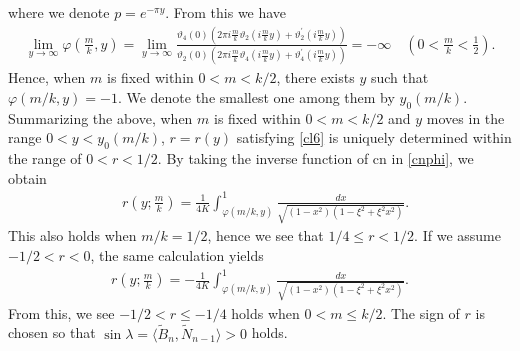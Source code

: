 \documentclass[10pt,leqno]{amsart}
\numberwithin{equation}{section}
\begin{document}
where we denote $p=e^{-\pi y}$.
From this we have
\begin{align}
    \lim_{y\to \infty}\varphi\left(\frac{m}{k},y\right)=\lim_{y\to \infty}\frac{\vartheta_4\left(0\right)\left(2\pi i\frac{m}{k}\vartheta_2\left(i\frac{m}{k}y\right)+\vartheta_2^{'}\left(i\frac{m}{k}y\right)\right)}{\vartheta_2\left(0\right)\left(2\pi i\frac{m}{k}\vartheta_4\left(i\frac{m}{k}y\right)+\vartheta_4^{'}\left(i\frac{m}{k}y\right)\right)}=-\infty\quad(0<\frac{m}{k}<\frac{1}{2}).
\end{align}
Hence, when $m$ is fixed within $0<m<k/2$, there exists $y$ such that $\varphi\left(m/k,y\right)=-1$. We denote the smallest one among them by $y_0(m/k)$.
Summarizing the above, when $m$ is fixed within $0<m<k/2$ and $y$ moves in the range $0<y< y_0(m/k)$, $r=r(y)$ satisfying \eqref{cl6} is uniquely determined within the range of $0<r<1/2$.
By taking the inverse function of $\mathrm{cn}$ in \eqref{cnphi}, we obtain
\begin{equation}\label{cnphi2}
 \begin{split}
 &r\left(y;\frac{m}{k}\right)=\frac{1}{4K}\int^{1}_{\varphi(m/k,y)}\frac{dx}{\sqrt{(1-x^2)(1-\xi^2+\xi^2x^2)}}.
  \end{split}
\end{equation}
This also holds when $m/k=1/2$, hence we see that $1/4\leq r<1/2$.
If we assume $-1/2<r<0$, the same calculation yields 
\begin{equation}\label{cnphi3} 
 \begin{split} 
 r\left(y;\frac{m}{k}\right)=-\frac{1}{4K}\int^{1}_{\varphi(m/k,y)}\frac{dx}{\sqrt{(1-x^2)(1-\xi^2+\xi^2x^2)}}.
 \end{split} 
\end{equation}
From this, we see $-1/2< r \leq -1/4$ holds when $0<m\leq k/2$.
The sign of $r$ is chosen so that $\sin\lambda = \langle\widetilde{B}_{n},\widetilde{N}_{n-1}\rangle>0$ holds.

\end{document}
